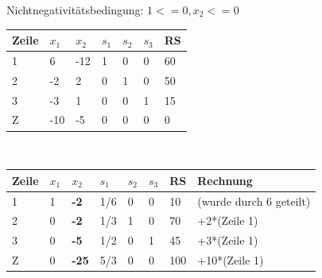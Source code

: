 Nichtnegativitätsbedingung:
\begin{math}1 <= 0, x_2 <= 0 \end{math}\\
\begin{table}[h]
\begin{tabular}{|l|l|l|l|l|l|l|}
\hline
\rowcolor[HTML]{C0C0C0} 
Zeile                     & $x_1$                         & $x_2$                          & $s_1$                        & $s_2$                        & $s_3$                        & RS \\ \hline
\cellcolor[HTML]{C0C0C0}1 & \cellcolor[HTML]{96FFFB}6  & \cellcolor[HTML]{FFFFFF}-12 & \cellcolor[HTML]{FFFFFF}1 & \cellcolor[HTML]{FFFFFF}0 & \cellcolor[HTML]{FFFFFF}0 & 60 \\ \hline
\cellcolor[HTML]{C0C0C0}2 & \cellcolor[HTML]{FFFFFF}-2 & \cellcolor[HTML]{FFFFFF}2   & \cellcolor[HTML]{FFFFFF}0 & \cellcolor[HTML]{FFFFFF}1 & \cellcolor[HTML]{FFFFFF}0 & 50 \\ \hline
\cellcolor[HTML]{C0C0C0}3 & \cellcolor[HTML]{FFFFFF}-3 & \cellcolor[HTML]{FFFFFF}1   & \cellcolor[HTML]{FFFFFF}0 & \cellcolor[HTML]{FFFFFF}0 & \cellcolor[HTML]{FFFFFF}1 & 15 \\ \hline
\cellcolor[HTML]{C0C0C0}Z & -10                        & -5                          & 0                         & 0                         & 0                         & 0  \\ \hline
\end{tabular}
\end{table}
\\
\begin{table}[!ht]
\begin{tabular}{|l|l|l|l|l|l|l|l|}
\hline
\rowcolor[HTML]{C0C0C0} 
Zeile                     & $x_1$                        & $x_2$                                  & $s_1$                          & $s_2$                        & $s_3$                        & RS  & Rechnung                \\ \hline
\cellcolor[HTML]{C0C0C0}1 & \cellcolor[HTML]{FFFFFF}1 & \cellcolor[HTML]{FFFFFF}\textbf{-2} & \cellcolor[HTML]{FFFFFF}1/6 & \cellcolor[HTML]{FFFFFF}0 & \cellcolor[HTML]{FFFFFF}0 & 10  & (wurde durch 6 geteilt) \\ \hline
\cellcolor[HTML]{C0C0C0}2 & \cellcolor[HTML]{FFFFFF}0 & \cellcolor[HTML]{FFFFFF}\textbf{-2} & \cellcolor[HTML]{FFFFFF}1/3 & \cellcolor[HTML]{FFFFFF}1 & \cellcolor[HTML]{FFFFFF}0 & 70  & +2*(Zeile 1)            \\ \hline
\cellcolor[HTML]{C0C0C0}3 & \cellcolor[HTML]{FFFFFF}0 & \cellcolor[HTML]{FFFFFF}\textbf{-5} & \cellcolor[HTML]{FFFFFF}1/2 & \cellcolor[HTML]{FFFFFF}0 & \cellcolor[HTML]{FFFFFF}1 & 45  & +3*(Zeile 1)            \\ \hline
\cellcolor[HTML]{C0C0C0}Z & 0                         & \textbf{-25}                        & 5/3                         & 0                         & 0                         & 100 & +10*(Zeile 1)           \\ \hline
\end{tabular}
\end{table}
